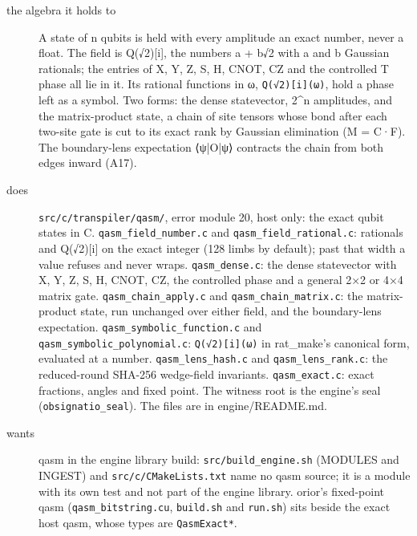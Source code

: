 \begin{description}
\item[{the algebra it holds to}] A state of n qubits is held with every amplitude an exact number, never a float. The field is Q(√2)[i], the numbers a + b√2 with a and b Gaussian rationals; the entries of X, Y, Z, S, H, CNOT, CZ and the controlled T phase all lie in it. Its rational functions in ω, \texttt{Q(√2)[i](ω)}, hold a phase left as a symbol. Two forms: the dense statevector, 2\textasciicircum{}n amplitudes, and the matrix-product state, a chain of site tensors whose bond after each two-site gate is cut to its exact rank by Gaussian elimination (M = C·F). The boundary-lens expectation ⟨ψ|O|ψ⟩ contracts the chain from both edges inward (A17).
\item[{does}] \texttt{src/\allowbreak{}c/\allowbreak{}transpiler/\allowbreak{}qasm/\allowbreak{}}, error module 20, host only: the exact qubit states in C. \texttt{qasm\_\allowbreak{}field\_\allowbreak{}number.\allowbreak{}c} and \texttt{qasm\_\allowbreak{}field\_\allowbreak{}rational.\allowbreak{}c}: rationals and Q(√2)[i] on the exact integer (128 limbs by default); past that width a value refuses and never wraps. \texttt{qasm\_\allowbreak{}dense.\allowbreak{}c}: the dense statevector with X, Y, Z, S, H, CNOT, CZ, the controlled phase and a general 2×2 or 4×4 matrix gate. \texttt{qasm\_\allowbreak{}chain\_\allowbreak{}apply.\allowbreak{}c} and \texttt{qasm\_\allowbreak{}chain\_\allowbreak{}matrix.\allowbreak{}c}: the matrix-product state, run unchanged over either field, and the boundary-lens expectation. \texttt{qasm\_\allowbreak{}symbolic\_\allowbreak{}function.\allowbreak{}c} and \texttt{qasm\_\allowbreak{}symbolic\_\allowbreak{}polynomial.\allowbreak{}c}: \texttt{Q(√2)[i](ω)} in rat\_\allowbreak{}make's canonical form, evaluated at a number. \texttt{qasm\_\allowbreak{}lens\_\allowbreak{}hash.\allowbreak{}c} and \texttt{qasm\_\allowbreak{}lens\_\allowbreak{}rank.\allowbreak{}c}: the reduced-round SHA-256 wedge-field invariants. \texttt{qasm\_\allowbreak{}exact.\allowbreak{}c}: exact fractions, angles and fixed point. The witness root is the engine's seal (\texttt{obsignatio\_\allowbreak{}seal}). The files are in engine/README.md.
\item[{wants}] qasm in the engine library build: \texttt{src/\allowbreak{}build\_\allowbreak{}engine.\allowbreak{}sh} (MODULES and INGEST) and \texttt{src/\allowbreak{}c/\allowbreak{}CMake\allowbreak{}Lists.\allowbreak{}txt} name no qasm source; it is a module with its own test and not part of the engine library. orior's fixed-point qasm (\texttt{qasm\_\allowbreak{}bitstring.\allowbreak{}cu}, \texttt{build.\allowbreak{}sh} and \texttt{run.\allowbreak{}sh}) sits beside the exact host qasm, whose types are \texttt{Qasm\allowbreak{}Exact*}.

\end{description}
